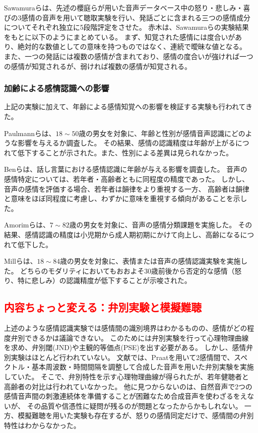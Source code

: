 Sawamuraらは、先述の櫻庭らが用いた音声データベース中の怒り・悲しみ・喜びの3感情の音声を用いて聴取実験を行い、発話ごとに含まれる三つの感情成分についてそれぞれ独立に5段階評定をさせた\cite{sawamura2007Emo}。
赤木は、Sawamuraらの実験結果をもとに以下のようにまとめている\cite{akagi2010EmoSpace}。
まず、知覚された感情には度合いがあり、絶対的な数値としての意味を持つものではなく、連続で曖昧な値となる。
また、一つの発話には複数の感情が含まれており、感情の度合いが強ければ一つの感情が知覚されるが、弱ければ複数の感情が知覚される。


\subsubsection{加齢による感情認識への影響}
上記の実験に加えて、年齢による感情知覚への影響を検証する実験も行われてきた。

Paulmannらは、$18 \sim 50$歳の男女を対象に、年齢と性別が感情音声認識にどのような影響を与えるか調査した\cite{paulmann2008aging}。
その結果、感情の認識精度は年齢が上がるにつれて低下することが示された。また、性別による差異は見られなかった。

Benらは、話し言葉における感情認識に年齢が与える影響を調査した\cite{ben2019age}。
音声の感情特定については、若年者・高齢者ともに同程度の精度であった。
しかし、音声の感情を評価する場合、若年者は韻律をより重視する一方、
高齢者は韻律と意味をほぼ同程度に考慮し、わずかに意味を重視する傾向があることを示した。

Amorimらは、$7 \sim 82$歳の男女を対象に、音声の感情分類課題を実施した\cite{amorim2021changes}。
その結果、感情認識の精度は小児期から成人期初期にかけて向上し、高齢になるにつれて低下した。

Millらは、$18 \sim 84$歳の男女を対象に、表情または音声の感情認識実験を実施した。
どちらのモダリティにおいてもおおよそ30歳前後から否定的な感情（怒り、特に悲しみ）の認識精度が低下することが示唆された。


\subsection{\textcolor{red}{内容ちょっと変える：弁別実験と模擬難聴}}
上述のような感情認識実験では感情間の識別境界はわかるものの、感情がどの程度弁別できるかは議論できない。
このためには弁別実験を行って心理物理曲線を求め、弁別閾(JND)や主観的等価点(PSE)を出す必要がある。
しかし、感情弁別実験はほとんど行われていない。
文献\cite{laukka2005categorical}では、Praat\cite{boersma2001speak}を用いて2感情間で、スペクトル・基本周波数・時間間隔を調整して合成した音声を用いた弁別実験を実施していた。
そこで、弁別特性を示す心理物理曲線が得られたが、若年健聴者と高齢者の対比は行われていなかった。
他に見つからないのは、自然音声で2つの感情音声間の刺激連続体を準備することが困難なため合成音声を使わざるをえないが、
その品質や信憑性に疑問が残るのが問題となったからかもしれない。
一方、模擬難聴を用いた実験も存在するが、怒りの感情同定\cite{morgan2022perceived}だけで、感情間の弁別特性はわからなかった。

